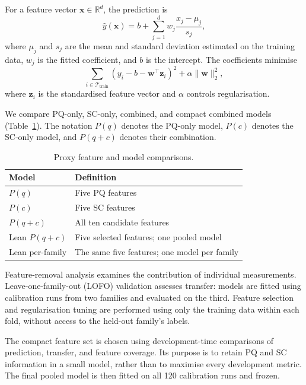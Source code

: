 \documentclass[a4paper,fleqn]{cas-dc}
\begin{document}
{For a feature vector $\mathbf{x}\in\mathbb{R}^{d}$, the prediction is
\begin{equation}
\hat{y}(\mathbf{x})
=
b+\sum_{j=1}^{d}
w_j\frac{x_j-\mu_j}{s_j},
\label{eq:ridge-proxy}
\end{equation}
where $\mu_j$ and $s_j$ are the mean and standard deviation estimated on the training data, $w_j$ is the fitted coefficient, and $b$ is the intercept. The coefficients minimise
\begin{equation}
\sum_{i\in\mathcal{T}_{\mathrm{train}}}
\left(y_i-b-\mathbf{w}^{\top}\mathbf{z}_i\right)^2
+\alpha\|\mathbf{w}\|_2^2,
\label{eq:ridge-objective}
\end{equation}
where $\mathbf{z}_i$ is the standardised feature vector and $\alpha$ controls regularisation.

We compare PQ-only, SC-only, combined, and compact combined models (Table~\ref{tab:proxy-ablation}). The notation $P(q)$ denotes the PQ-only model, $P(c)$ denotes the SC-only model, and $P(q{+}c)$ denotes their combination.

\begin{table}[ht]
\caption{Proxy feature and model comparisons.}
\label{tab:proxy-ablation}
\centering
\begin{tabular}{p{} p{}}
\toprule
Model & Definition \\
\midrule
$P(q)$ & Five PQ features \\
$P(c)$ & Five SC features \\
$P(q{+}c)$ & All ten candidate features \\
Lean $P(q{+}c)$ & Five selected features; one pooled model \\
Lean per-family & The same five features; one model per family \\
\bottomrule
\end{tabular}
\end{table}

Feature-removal analysis examines the contribution of individual measurements. Leave-one-family-out (LOFO) validation assesses transfer: models are fitted using calibration runs from two families and evaluated on the third. Feature selection and regularisation tuning are performed using only the training data within each fold, without access to the held-out family's labels.

The compact feature set is chosen using development-time comparisons of prediction, transfer, and feature coverage. Its purpose is to retain PQ and SC information in a small model, rather than to maximise every development metric. The final pooled model is then fitted on all 120 calibration runs and frozen.

}
\end{document}
